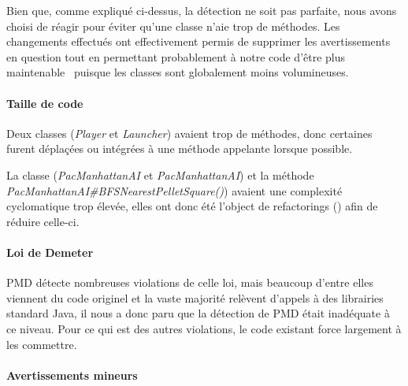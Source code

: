 \documentclass[12pt, openany]{report}
\begin{document}
Bien que, comme expliqué ci-dessus, la détection ne soit pas parfaite, nous avons choisi de réagir pour éviter qu'une classe n'aie trop de méthodes. Les changements effectués ont effectivement permis de supprimer les avertissements en question tout en permettant probablement à notre code d'être plus \og maintenable \fg \, puisque les classes sont globalement moins volumineuses.



\paragraph{Taille de code}

Deux classes (\mbox{\textit{Player}} et \mbox{\textit{Launcher}}) avaient trop de méthodes, donc certaines furent déplaçées ou intégrées à une méthode appelante lorsque possible.

La classe (\mbox{\textit{PacManhattanAI}} et \mbox{\textit{PacManhattanAI}}) et la méthode \mbox{\textit{PacManhattanAI\#BFSNearestPelletSquare()}}) avaient une complexité cyclomatique trop élevée, elles ont donc été l'object de \og refactorings \fg() afin de réduire celle-ci.

\paragraph{Loi de Demeter}

PMD détecte nombreuses violations de celle loi, mais beaucoup d'entre elles viennent du code originel et la vaste majorité relèvent d'appels à des librairies standard Java, il nous a donc paru que la détection de PMD était inadéquate à ce niveau.
Pour ce qui est des autres violations, le code existant force largement à les commettre.

\paragraph{Avertissements mineurs}
\end{document}
